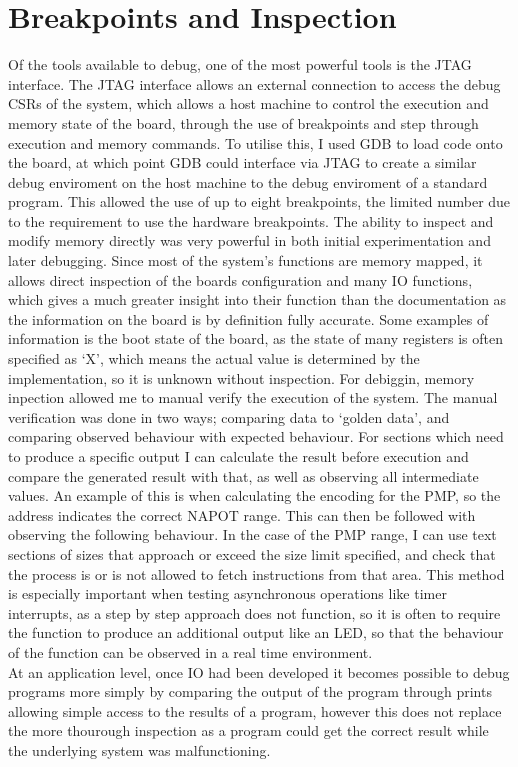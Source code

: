 \section{Breakpoints and Inspection}
Of the tools available to debug, one of the most powerful tools is the JTAG interface. The JTAG interface allows an external connection to access the debug CSRs of the system, which allows a host machine to control the execution and memory state of the board, through the use of breakpoints and step through execution and memory commands. To utilise this, I used GDB to load code onto the board, at which point GDB could interface via JTAG to create a similar debug enviroment on the host machine to the debug enviroment of a standard program. This allowed the use of up to eight breakpoints, the limited number due to the requirement to use the hardware breakpoints. The ability to inspect and modify memory directly was very powerful in both initial experimentation and later debugging. Since most of the system's functions are memory mapped, it allows direct inspection of the boards configuration and many IO functions, which gives a much greater insight into their function than the documentation as the information on the board is by definition fully accurate. Some examples of information is the boot state of the board, as the state of many registers is often specified as `X', which means the actual value is determined by the implementation, so it is unknown without inspection. For debiggin, memory inpection allowed me to manual verify the execution of the system. The manual verification was done in two ways; comparing data to `golden data', and comparing observed behaviour with expected behaviour. For sections which need to produce a specific output I can calculate the result before execution and compare the generated result with that, as well as observing all intermediate values. An example of this is when calculating the encoding for the PMP, so the address indicates the correct NAPOT range. This can then be followed with observing the following behaviour. In the case of the PMP range, I can use text sections of sizes that approach or exceed the size limit specified, and check that the process is or is not allowed to fetch instructions from that area. This method is especially important when testing asynchronous operations like timer interrupts, as a step by step approach does not function, so it is often to require the function to produce an additional output like an LED, so that the behaviour of the function can be observed in a real time environment.\\
At an application level, once IO had been developed it becomes possible to debug programs more simply by comparing the output of the program through prints allowing simple access to the results of a program, however this does not replace the more thourough inspection as a program could get the correct result while the underlying system was malfunctioning.

